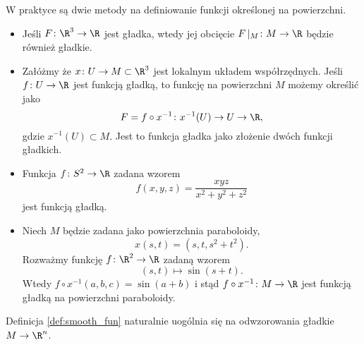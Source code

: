 \begin{frame}

 W praktyce są dwie metody na definiowanie funkcji określonej na powierzchni.
\pause \begin{itemize}[<+->]
\item Jeśli $F\colon \R^3\to \R$ jest gładka, wtedy jej obcięcie 
$F\,|_M\colon M\to \R$ będzie również gładkie.
\item Załóżmy że  $x\colon U\to M\subset \R^3$ jest lokalnym układem 
współrzędnych. Jeśli $f\colon U\to \R$ jest funkcją gładką, to funkcję  na 
powierzchni $M$ możemy określić jako\[F=f\circ x^{-1}\colon x^{-1}(U)\to U\to 
\R,\] gdzie $x^{-1}(U)\subset M$.
Jest to funkcja gładka jako złożenie dwóch funkcji gładkich.
\end{itemize}

\end{frame}
\begin{frame}

\begin{przyklad}
\begin{itemize}
\item Funkcja $f\colon S^2\to \R$ zadana wzorem
\[f(x,y,z)=\frac{xyz}{x^2+y^2+z^2}\]
jest funkcją gładką.
\pause\item Niech $M$ będzie zadana jako powierzchnia paraboloidy, 
\[x(s,t)=(s,t,s^2+t^2).\]
\pause Rozważmy funkcję $f\colon \R^2\to \R$ zadaną wzorem 
\[(s,t)\mapsto \sin{(s+t)}.\]
\pause Wtedy $f\circ x^{-1}(a,b,c)=\sin{(a+b)}$  i stąd 
$f\circ x^{-1}\colon M\to\R$ jest funkcją gładką na powierzchni paraboloidy.
\end{itemize}
\end{przyklad}

\end{frame}
\begin{uwaga}
Definicja \ref{def:smooth_fun} naturalnie uogólnia się na odwzorowania gładkie $M\to \R^n$.
\end{uwaga}

